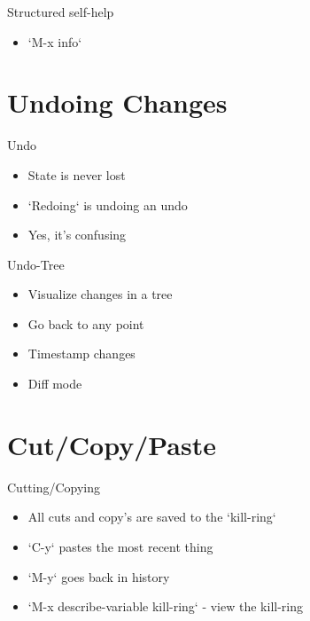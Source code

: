 \documentclass[bigger]{beamer}
\begin{document}
\begin{frame}[label=sec-3-8]{Structured self-help}
\begin{itemize}
\item `M-x info`
\end{itemize}
\end{frame}

\section{Undoing Changes}
\label{sec-4}
\begin{frame}[label=sec-4-1]{Undo}
\begin{itemize}
\item State is never lost
\item `Redoing` is undoing an undo
\item Yes, it's confusing
\end{itemize}
\end{frame}

\begin{frame}[label=sec-4-2]{Undo-Tree}
\begin{itemize}
\item Visualize changes in a tree
\item Go back to any point
\item Timestamp changes
\item Diff mode
\end{itemize}
\end{frame}

\section{Cut/Copy/Paste}
\label{sec-5}
\begin{frame}[label=sec-5-1]{Cutting/Copying}
\begin{itemize}
\item All cuts and copy's are saved to the `kill-ring`
\item `C-y` pastes the most recent thing
\item `M-y` goes back in history
\item `M-x describe-variable kill-ring` - view the kill-ring
\end{itemize}
\end{frame}
\end{document}
